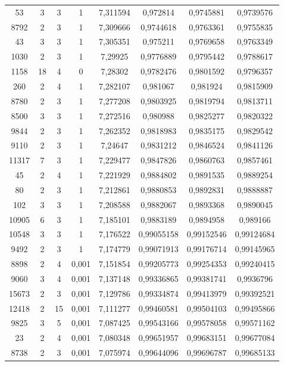 \begin{longtable}{|c|c|c|c|c|c|c|c|}
53 & 3 & 3 & 1 & 7,311594 & 0,972814 & 0,9745881 & 0,9739576 \\
8792 & 2 & 3 & 1 & 7,309666 & 0,9744618 & 0,9763361 & 0,9755835 \\
43 & 3 & 3 & 1 & 7,305351 & 0,975211 & 0,9769658 & 0,9763349 \\
1030 & 2 & 3 & 1 & 7,29925 & 0,9776889 & 0,9795442 & 0,9788617 \\
1158 & 18 & 4 & 0 & 7,28302 & 0,9782476 & 0,9801592 & 0,9796357 \\
260 & 2 & 4 & 1 & 7,282107 & 0,981067 & 0,981924 & 0,9815909 \\
8780 & 2 & 3 & 1 & 7,277208 & 0,9803925 & 0,9819794 & 0,9813711 \\
8500 & 3 & 3 & 1 & 7,272516 & 0,980988 & 0,9825277 & 0,9820322 \\
9844 & 2 & 3 & 1 & 7,262352 & 0,9818983 & 0,9835175 & 0,9829542 \\
9110 & 2 & 3 & 1 & 7,24647 & 0,9831212 & 0,9846524 & 0,9841126 \\
11317 & 7 & 3 & 1 & 7,229477 & 0,9847826 & 0,9860763 & 0,9857461 \\
45 & 2 & 4 & 1 & 7,221929 & 0,9884802 & 0,9891535 & 0,9889254 \\
80 & 2 & 3 & 1 & 7,212861 & 0,9880853 & 0,9892831 & 0,9888887 \\
102 & 3 & 3 & 1 & 7,208588 & 0,9882067 & 0,9893368 & 0,9890045 \\
10905 & 6 & 3 & 1 & 7,185101 & 0,9883189 & 0,9894958 & 0,989166 \\
10548 & 3 & 3 & 1 & 7,176522 & 0,99055158 & 0,99152546 & 0,99124684 \\
9492 & 2 & 3 & 1 & 7,174779 & 0,99071913 & 0,99176714 & 0,99145965 \\
8898 & 2 & 4 & 0,001 & 7,151854 & 0,99205773 & 0,99254353 & 0,99240415 \\
9060 & 3 & 4 & 0,001 & 7,137148 & 0,99336865 & 0,99381741 & 0,9936796 \\
15673 & 2 & 3 & 0,001 & 7,129786 & 0,99334874 & 0,99413979 & 0,99392521 \\
12418 & 2 & 15 & 0,001 & 7,111277 & 0,99460581 & 0,99504103 & 0,99495866 \\
9825 & 3 & 5 & 0,001 & 7,087425 & 0,99543166 & 0,99578058 & 0,99571162 \\
23 & 2 & 4 & 0,001 & 7,080348 & 0,99651957 & 0,99683151 & 0,99677084 \\
8738 & 2 & 3 & 0,001 & 7,075974 & 0,99644096 & 0,99696787 & 0,99685133 \\

\end{longtable}
